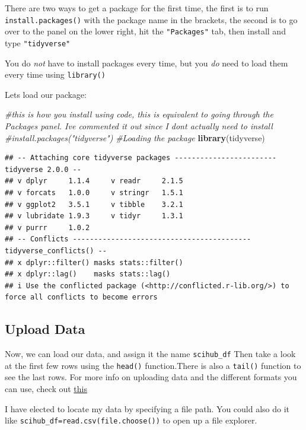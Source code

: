 \documentclass[
]{article}
\newenvironment{Shaded}{\begin{snugshade}}{\end{snugshade}}
\newcommand{\CommentTok}[1]{\textcolor[rgb]{0.56,0.35,0.01}{\textit{#1}}}
\newcommand{\FunctionTok}[1]{\textcolor[rgb]{0.13,0.29,0.53}{\textbf{#1}}}
\newcommand{\NormalTok}[1]{#1}
\begin{document}
There are two ways to get a package for the first time, the first is to
run \texttt{install.packages()} with the package name in the brackets,
the second is to go over to the panel on the lower right, hit the
\texttt{"Packages"} tab, then install and type \texttt{"tidyverse"}

You do \emph{not} have to install packages every time, but you \emph{do}
need to load them every time using \texttt{library()}

Lets load our package:

\begin{Shaded}
\begin{Highlighting}[]
\CommentTok{\#this is how you install using code, this is equivalent to going through the Packages panel. I\textquotesingle{}ve commented it out since I don\textquotesingle{}t actually need to install }
\CommentTok{\#install.packages("tidyverse") }
\CommentTok{\#Loading the package}
\FunctionTok{library}\NormalTok{(tidyverse) }
\end{Highlighting}
\end{Shaded}

\begin{verbatim}
## -- Attaching core tidyverse packages ------------------------ tidyverse 2.0.0 --
## v dplyr     1.1.4     v readr     2.1.5
## v forcats   1.0.0     v stringr   1.5.1
## v ggplot2   3.5.1     v tibble    3.2.1
## v lubridate 1.9.3     v tidyr     1.3.1
## v purrr     1.0.2     
## -- Conflicts ------------------------------------------ tidyverse_conflicts() --
## x dplyr::filter() masks stats::filter()
## x dplyr::lag()    masks stats::lag()
## i Use the conflicted package (<http://conflicted.r-lib.org/>) to force all conflicts to become errors
\end{verbatim}

\subsection{Upload Data}\label{upload-data}

Now, we can load our data, and assign it the name \texttt{scihub\_df}
Then take a look at the first few rows using the \texttt{head()}
function.There is also a \texttt{tail()} function to see the last rows.
For more info on uploading data and the different formats you can use,
check out \href{https://intro2r.com/importing-data.html}{this}

I have elected to locate my data by specifying a file path. You could
also do it like \texttt{scihub\_df=read.csv(file.choose())} to open up a
file explorer.
\end{document}
